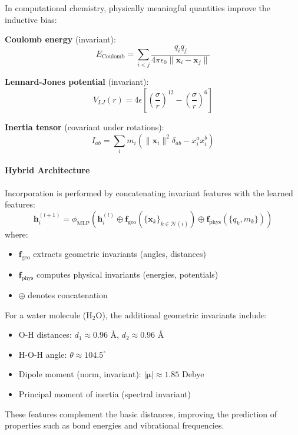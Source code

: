 In computational chemistry, physically meaningful quantities improve the inductive bias:

\textbf{Coulomb energy} (invariant):
\begin{equation}
E_{\text{Coulomb}} = \sum_{i < j} \frac{q_i q_j}{4\pi \epsilon_0 \|\mathbf{x}_i - \mathbf{x}_j\|}
\end{equation}

\textbf{Lennard-Jones potential} (invariant):
\begin{equation}
V_{LJ}(r) = 4\epsilon \left[\left(\frac{\sigma}{r}\right)^{12} - \left(\frac{\sigma}{r}\right)^6\right]
\end{equation}

\textbf{Inertia tensor} (covariant under rotations):
\begin{equation}
I_{ab} = \sum_i m_i \left(\|\mathbf{x}_i\|^2 \delta_{ab} - x_i^a x_i^b\right)
\end{equation}

\paragraph{Hybrid Architecture}

Incorporation is performed by concatenating invariant features with the learned features:
\begin{equation}
\mathbf{h}_i^{(l+1)} = \phi_{\text{MLP}}\left(\mathbf{h}_i^{(l)} \oplus \mathbf{f}_{\text{geo}}(\{\mathbf{x}_k\}_{k \in \mathcal{N}(i)}) \oplus \mathbf{f}_{\text{phys}}(\{q_k, m_k\})\right)
\end{equation}
where:
\begin{itemize}
    \item $\mathbf{f}_{\text{geo}}$ extracts geometric invariants (angles, distances)
    \item $\mathbf{f}_{\text{phys}}$ computes physical invariants (energies, potentials)
    \item $\oplus$ denotes concatenation
\end{itemize}

\begin{example}
For a water molecule (H$_2$O), the additional geometric invariants include:
\begin{itemize}
    \item O-H distances: $d_1 \approx 0.96$ Å, $d_2 \approx 0.96$ Å
    \item H-O-H angle: $\theta \approx 104.5^\circ$
    \item Dipole moment (norm, invariant): $|\boldsymbol{\mu}| \approx 1.85$ Debye
    \item Principal moment of inertia (spectral invariant)
\end{itemize}

These features complement the basic distances, improving the prediction of properties such as bond energies and vibrational frequencies.
\end{example}

